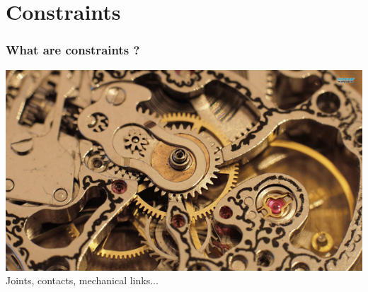 \documentclass{beamer}
\begin{document}
\section{Constraints}
\begin{frame}
 \frametitle{What are constraints ?}
 \includegraphics[width=\textwidth]{watch.png}\\
  Joints, contacts, mechanical links...
\end{frame}
\end{document}
